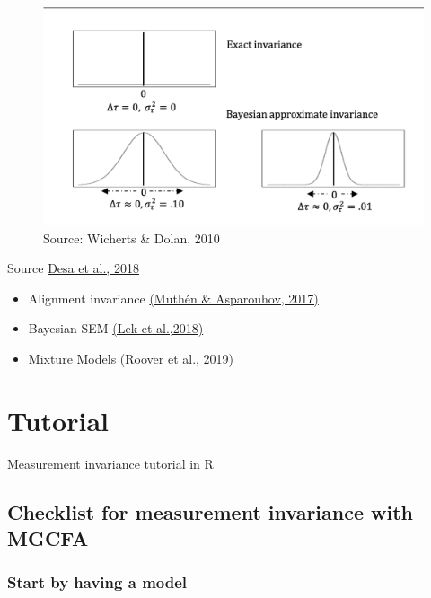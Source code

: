 \documentclass[
]{book}
\begin{document}
\begin{figure}
\includegraphics[width=0.8\linewidth]{approximate} \caption{Source: Wicherts & Dolan, 2010}\label{fig:approximate}
\end{figure}

Source \href{https://onlinelibrary.wiley.com/doi/abs/10.1002/9781118884997.ch40}{Desa et al., 2018}

\begin{itemize}
\item
  Alignment invariance \href{https://doi.org/10.1177/0049124117701488}{(Muthén \& Asparouhov, 2017)}
\item
  Bayesian SEM \href{https://onlinelibrary.wiley.com/doi/abs/10.1002/9781118884997.ch41}{(Lek et al.,2018)}
\item
  Mixture Models \href{https://www.researchgate.net/publication/338051963_Mixture_multigroup_factor_analysis_for_unraveling_factor_loading_non-_invariance_across_many_groups}{(Roover et al., 2019)}
\end{itemize}

\hypertarget{tutorial}{%
\chapter{Tutorial}\label{tutorial}}

Measurement invariance tutorial in R

\hypertarget{checklist-for-measurement-invariance-with-mgcfa}{%
\section{Checklist for measurement invariance with MGCFA}\label{checklist-for-measurement-invariance-with-mgcfa}}

\hypertarget{start-by-having-a-model}{%
\subsection{Start by having a model}\label{start-by-having-a-model}}
\end{document}
